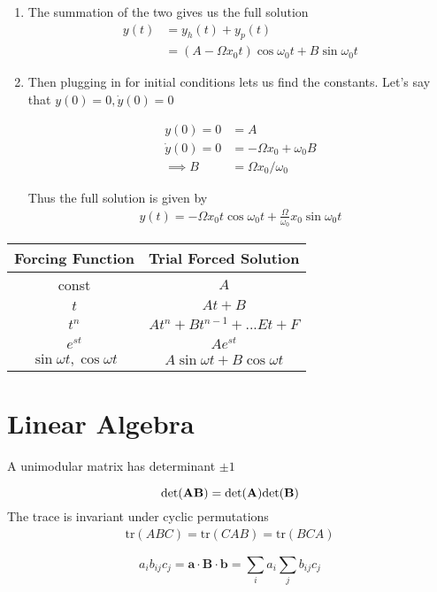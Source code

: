 \begin{enumerate}
\item The summation of the two gives us the full solution
\begin{align}
y(t) &= y_h(t) + y_p(t)\\
 &= (A-\Omega x_0 t)\cos\omega_0 t + B\sin\omega_0 t
\end{align}
\item Then plugging in for initial conditions lets us find the constants. Let's say that $y(0) = 0, \dot{y}(0) = 0$

\begin{align}
y(0) = 0 &= A\\
\dot{y}(0) = 0 &= -\Omega x_0 +\omega_0 B\\
\implies B &= \Omega x_0/\omega_0
\end{align}

Thus the full solution is given by
\begin{align}
y(t) = -\Omega x_0 t\cos\omega_0 t +\frac{\Omega}{\omega_0} x_0\sin\omega_0 t
\end{align}



\end{enumerate}


\begin{center}
 \begin{tabular}{||c c||} 
 \hline
Forcing Function & Trial Forced Solution \\ [0.5ex] 
 \hline\hline
 const & $A$  \\ 
 \hline
 $t$ & $At+ B$  \\
 \hline
 $t^n$ & $At^n + Bt^{n-1} + ... Et + F$  \\
 \hline
 $e^{st}$ & $Ae^{st}$ \\
 \hline
 $\sin\omega t, \cos\omega t$ & $A\sin\omega t + B\cos\omega t$   \\ 
 \hline
\end{tabular}\label{forcing}
\end{center}
\section{Linear Algebra}
A unimodular matrix has determinant $\pm 1$


$$\rm{det}(\bf{AB}) = \rm{det}(\bf{A})\rm{det}(\bf{B})$$
The trace is invariant under cyclic permutations
\begin{align}
	\textrm{tr}(ABC) = \textrm{tr}(CAB) = \textrm{tr}(BCA)
\end{align}

$$a_i b_{ij} c_j = \textbf{a}\cdot\textbf{B}\cdot\textbf{b} = \sum_{i} a_i \sum_{j} b_{ij} c_j$$

